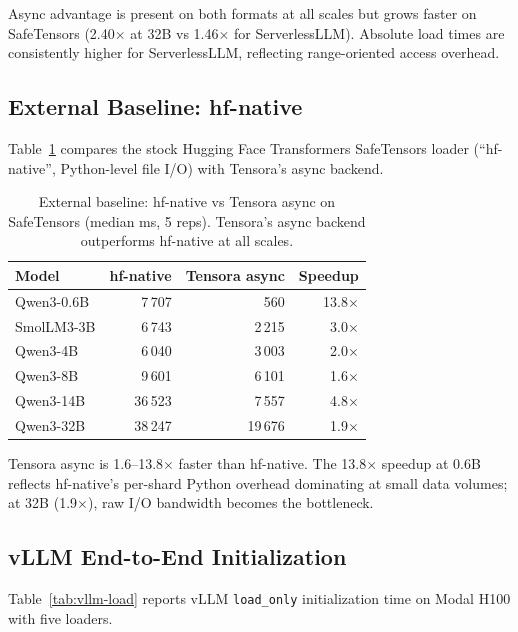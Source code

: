 Async advantage is present on both formats at all scales but grows faster on SafeTensors (2.40$\times$ at 32B vs 1.46$\times$ for ServerlessLLM). Absolute load times are consistently higher for ServerlessLLM, reflecting range-oriented access overhead.

\subsection{External Baseline: hf-native}
\label{sec:hf-native}

Table~\ref{tab:hf-native} compares the stock Hugging Face Transformers SafeTensors loader (``hf-native'', Python-level file I/O) with Tensora's async backend.

\begin{table}[htbp]
\caption{External baseline: hf-native vs Tensora async on SafeTensors (median ms, 5 reps). Tensora's async backend outperforms hf-native at all scales.}
\label{tab:hf-native}
\centering
\begin{tabular}{lrrr}
\toprule
Model & hf-native & Tensora async & Speedup \\
\midrule
Qwen3-0.6B & 7\,707 & 560 & 13.8$\times$ \\
SmolLM3-3B & 6\,743 & 2\,215 & 3.0$\times$ \\
Qwen3-4B & 6\,040 & 3\,003 & 2.0$\times$ \\
Qwen3-8B & 9\,601 & 6\,101 & 1.6$\times$ \\
Qwen3-14B & 36\,523 & 7\,557 & 4.8$\times$ \\
Qwen3-32B & 38\,247 & 19\,676 & 1.9$\times$ \\
\bottomrule
\end{tabular}
\end{table}

Tensora async is 1.6--13.8$\times$ faster than hf-native. The 13.8$\times$ speedup at 0.6B reflects hf-native's per-shard Python overhead dominating at small data volumes; at 32B (1.9$\times$), raw I/O bandwidth becomes the bottleneck.

\subsection{vLLM End-to-End Initialization}
\label{sec:vllm-results}

Table~\ref{tab:vllm-load} reports vLLM \texttt{load\_only} initialization time
on Modal H100 with five loaders.

